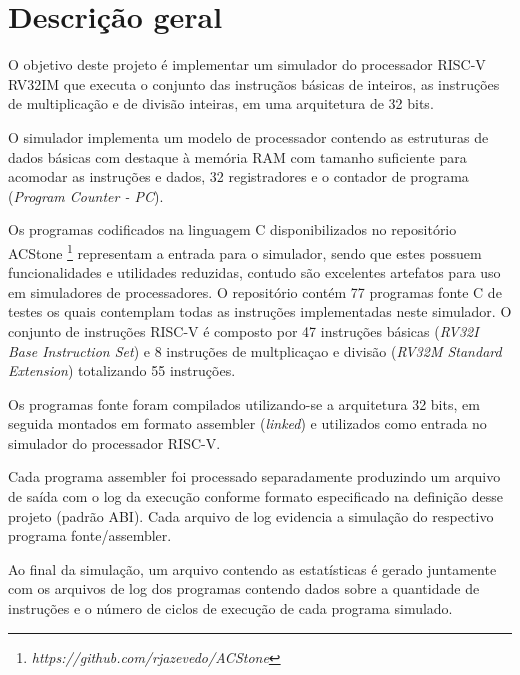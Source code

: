 
\section{Descrição geral}


O objetivo deste projeto é implementar um simulador do processador RISC-V RV32IM que executa o conjunto das instruçãos básicas de inteiros, as instruções de multiplicação e de divisão inteiras, em uma arquitetura de 32 bits.

O simulador implementa um modelo de processador contendo as estruturas de dados básicas com destaque à memória RAM com tamanho suficiente para acomodar as instruções e dados, 32 registradores e o contador de programa (\textit{Program Counter - PC}). 

Os programas codificados na linguagem C disponibilizados no repositório ACStone \footnote[1]{\textit{https://github.com/rjazevedo/ACStone}} representam a entrada para o simulador, sendo que estes possuem funcionalidades e utilidades reduzidas, contudo são excelentes artefatos para uso em simuladores de processadores. O repositório contém 77 programas fonte C de testes os quais contemplam todas as instruções implementadas neste simulador. O conjunto de instruções RISC-V é composto por 47 instruções básicas (\textit{RV32I Base Instruction Set}) e 8 instruções de multplicaçao e divisão (\textit{RV32M Standard Extension}) totalizando 55 instruções. 

Os programas fonte foram compilados utilizando-se a arquitetura 32 bits, em seguida montados em formato assembler (\textit{linked}) e utilizados como entrada no simulador do processador RISC-V.

Cada programa assembler foi processado separadamente produzindo um arquivo de saída com o log da execução conforme formato especificado na definição desse projeto (padrão ABI). Cada arquivo de log evidencia a simulação do respectivo programa fonte/assembler.

Ao final da simulação, um arquivo contendo as estatísticas é gerado juntamente com os arquivos de log dos programas contendo dados sobre a quantidade de instruções e o número de ciclos de execução de cada programa simulado.